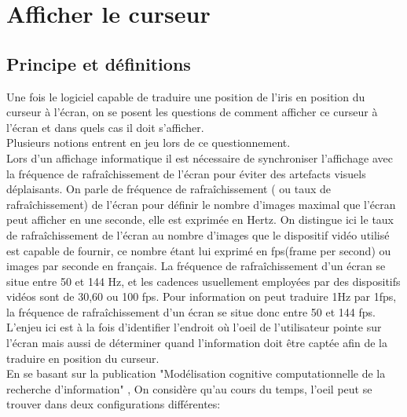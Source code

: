 \documentclass[a4paper, 12pt]{report}
\begin{document}
\newpage

    \section{Afficher le curseur}
		\subsection{Principe et définitions}
Une fois le logiciel capable de traduire une position de l'iris en position du curseur à l'écran, on se posent les questions de comment afficher ce curseur à l'écran et dans quels cas il doit s'afficher. \\
Plusieurs notions entrent en jeu lors de ce questionnement.\\
Lors d'un affichage informatique il est nécessaire de synchroniser l'affichage avec la fréquence de rafraîchissement de l'écran pour éviter des artefacts visuels déplaisants.
On parle de fréquence de rafraîchissement ( ou taux de rafraîchissement) de l'écran pour définir le nombre d'images maximal que l'écran peut afficher en une seconde, elle est exprimée en Hertz. On distingue ici le taux de  rafraîchissement de l'écran au nombre d'images que le dispositif vidéo utilisé est capable de fournir, ce nombre étant lui exprimé en fps(frame per second) ou images par seconde en français.
La fréquence de rafraîchissement d'un écran se situe entre 50 et 144 Hz, et les cadences usuellement employées par des dispositifs vidéos sont de 30,60 ou 100 fps. Pour information on peut traduire 1Hz par 1fps, la fréquence de rafraîchissement d'un écran se situe donc entre 50 et 144 fps.\\
L'enjeu ici est à la fois d'identifier l'endroit où l'oeil de l'utilisateur pointe sur l'écran mais aussi de déterminer quand l'information doit être captée afin de la traduire en position du curseur.\\
En se basant sur la publication "Modélisation cognitive computationnelle de la recherche d'information" \cite{c4}, On considère qu'au cours du temps, l'oeil peut se trouver dans deux configurations différentes:
\end{document}
